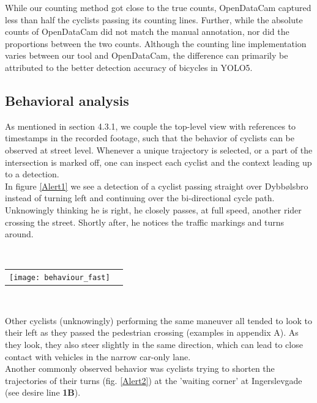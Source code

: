 While our counting method got close to the true counts, OpenDataCam captured less than half the cyclists passing its 
counting lines. Further, while the absolute counts of OpenDataCam did not match the manual annotation, 
nor did the proportions between the two counts.
Although the counting line implementation varies between our tool and OpenDataCam, 
the difference can primarily be attributed to the better detection accuracy of bicycles in YOLO5.
\ \\

\subsection{Behavioral analysis}
As mentioned in section 4.3.1, we couple the top-level view with references to timestamps in the recorded footage, 
such that the behavior of cyclists can be observed at street level.
Whenever a unique trajectory is selected, or a part of the intersection is marked off, one can inspect each cyclist 
and the context leading up to a detection.
\\

In figure \ref{Alert1} we see a detection of a cyclist passing straight over Dybbølsbro instead of turning left and 
continuing over the bi-directional cycle path. Unknowingly thinking he is right, he closely passes, at full speed, another rider crossing
the street. Shortly after, he notices the traffic markings and turns around. 

\ \\ 
\raggedbottom
\begin{tabular}{@{}cc}
\texttt{[image: behaviour\_fast]} 
\end{tabular}
\label{Alert1}
\

Other cyclists (unknowingly) performing the same maneuver all tended to look to their left 
as they passed the pedestrian crossing (examples in appendix A).
As they look, they also steer slightly in the same direction, which can lead to close contact with vehicles
in the narrow car-only lane. 
\ \\

Another commonly observed behavior was cyclists trying to shorten the trajectories of their turns (fig. \ref{Alert2})
at the 'waiting corner' at Ingerslevgade (see desire line \textbf{1B}).

